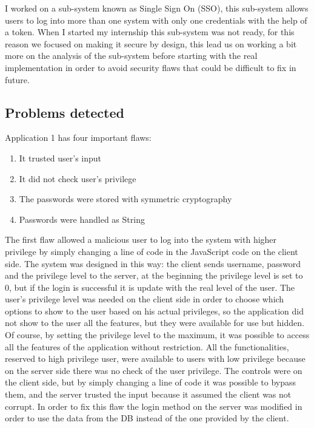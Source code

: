 I worked on a sub-system known as Single Sign On (SSO), this sub-system allows users to log into more than one system
with only one credentials with the help of a token.\newline
When I started my internship this sub-system was not ready, for this reason we focused on making it secure by design, this lead us on working a bit more on the analysis of the sub-system before starting with the real implementation in order to avoid security flaws that could be difficult to fix in future.\newline


\subsection{Problems detected}
Application 1 has four important flaws:
\begin{enumerate}
	\item It trusted user’s input
	\item It did not check user’s privilege
	\item The passwords were stored with symmetric cryptography
	\item Passwords were handled as String
\end{enumerate}

The first flaw allowed a malicious user to log into the system with higher privilege by simply changing a line of code in the JavaScript code on the client side.\newline
The system was designed in this way: the client sends username, password and the privilege level to the server, at the beginning the privilege level is set to 0, but if the login is successful it is update with the real level of the user.\newline
The user’s privilege level was needed on the client side in order to choose which options to show to the user based on his actual privileges, so the application did not show to the user all the features, but they were available for use but hidden.\newline
Of course, by setting the privilege level to the maximum, it was possible to access all the features of the application without restriction.\newline
All the functionalities, reserved to high privilege user, were available to users with low privilege because on the server side there was no check of the user privilege.\newline
The controls were on the client side, but by simply changing a line of code it was possible to bypass them, and the server trusted the input because it assumed the client was not corrupt.\newline
In order to fix this flaw the login method on the server was modified in order to use the data from the DB instead of the one provided by the client.\newline


